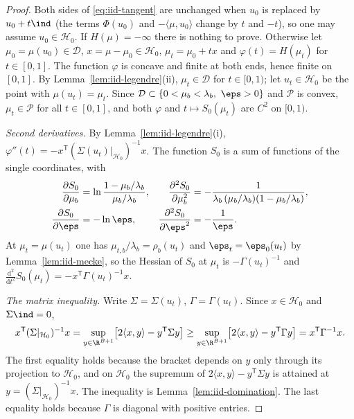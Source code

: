 \begin{proof}
Both sides of \eqref{eq:iid-tangent} are unchanged when $u_0$ is replaced by $u_0+t\ind$
(the terms $\Phi(u_0)$ and $-\langle\mu,u_0\rangle$ change by $t$ and $-t$), so one may
assume $u_0\in\mathcal{H}_0$. If $H(\mu)=-\infty$ there is nothing to prove. Otherwise let
$\mu_0=\mu(u_0)\in\mathcal{D}$, $x=\mu-\mu_0\in\mathcal{H}_0$,
$\mu_t=\mu_0+tx$ and $\varphi(t)=H(\mu_t)$ for $t\in[0,1]$. The function $\varphi$ is
concave and finite at both ends, hence finite on $[0,1]$. By
Lemma~\ref{lem:iid-legendre}(ii), $\mu_t\in\mathcal{D}$ for $t\in[0,1)$; let
$u_t\in\mathcal{H}_0$ be the point with $\mu(u_t)=\mu_t$. Since $\mathcal{D}\subset
\{0<\mu_b<\lambda_b,\ \eps>0\}$ and $\mathcal{P}$ is convex, $\mu_t\in\mathcal{P}$ for all
$t\in[0,1]$, and both $\varphi$ and $t\mapsto S_0(\mu_t)$ are $C^2$ on $[0,1)$.

\emph{Second derivatives.} By Lemma~\ref{lem:iid-legendre}(i),
$\varphi''(t)=-x^{\mathsf T}(\Sigma(u_t)|_{\mathcal{H}_0})^{-1}x$. The function $S_0$ is a
sum of functions of the single coordinates, with
\begin{align*}
\frac{\partial S_0}{\partial\mu_b}&=\ln\frac{1-\mu_b/\lambda_b}{\mu_b/\lambda_b},&
\frac{\partial^2S_0}{\partial\mu_b^2}&=-\frac{1}{\lambda_b\,(\mu_b/\lambda_b)(1-\mu_b/\lambda_b)},\\
\frac{\partial S_0}{\partial\eps}&=-\ln\eps,&
\frac{\partial^2S_0}{\partial\eps^2}&=-\frac1\eps .
\end{align*}
At $\mu_t=\mu(u_t)$ one has $\mu_{t,b}/\lambda_b=\rho_b(u_t)$ and
$\eps_t=\eps_0(u_t)$ by Lemma~\ref{lem:iid-mecke}, so the Hessian of $S_0$ at $\mu_t$ is
$-\Gamma(u_t)^{-1}$ and
$\frac{\mathrm{d}^2}{\mathrm{d}t^2}S_0(\mu_t)=-x^{\mathsf T}\Gamma(u_t)^{-1}x$.

\emph{The matrix inequality.} Write $\Sigma=\Sigma(u_t)$, $\Gamma=\Gamma(u_t)$. Since
$x\in\mathcal{H}_0$ and $\Sigma\ind=0$,
\[
x^{\mathsf T}(\Sigma|_{\mathcal{H}_0})^{-1}x
=\sup_{y\in\R^{B+1}}\bigl[2\langle x,y\rangle-y^{\mathsf T}\Sigma y\bigr]
\ge\sup_{y\in\R^{B+1}}\bigl[2\langle x,y\rangle-y^{\mathsf T}\Gamma y\bigr]
=x^{\mathsf T}\Gamma^{-1}x .
\]
The first equality holds because the bracket depends on $y$ only through its projection to
$\mathcal{H}_0$, and on $\mathcal{H}_0$ the supremum of
$2\langle x,y\rangle-y^{\mathsf T}\Sigma y$ is attained at
$y=(\Sigma|_{\mathcal{H}_0})^{-1}x$. The inequality is Lemma~\ref{lem:iid-domination}. The
last equality holds because $\Gamma$ is diagonal with positive entries.


\end{proof}
